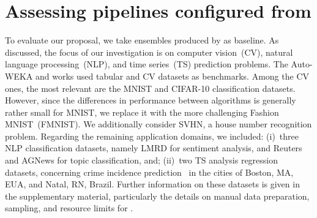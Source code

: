 \section{Assessing pipelines configured from \isklearn}
\label{sec:results}

To evaluate our proposal, we take ensembles produced by \autosklearn as baseline. As discussed, the focus of our investigation is on computer vision~(CV), natural language processing~(NLP), and time series~(TS) prediction problems. The Auto-WEKA and \autosklearn works used tabular and CV datasets as benchmarks. Among the CV ones, the most relevant are 
the MNIST and CIFAR-10 classification datasets. However, since the differences in performance between algorithms is generally rather small for MNIST, we replace it with the more challenging Fashion MNIST~(FMNIST). We additionally consider SVHN, a house number recognition problem. Regarding the remaining application domains, we included: (i)~three NLP classification datasets, namely LMRD for sentiment analysis, and Reuters and AGNews for topic classification, and; (ii)~two TS analysis regression datasets, concerning crime incidence prediction~\cite{kounadi2020systematic} in the cities of Boston, MA, EUA, and Natal, RN, Brazil. Further information on these datasets is given in the supplementary material, particularly the details on manual data preparation, sampling, and resource limits for \autosklearn.


